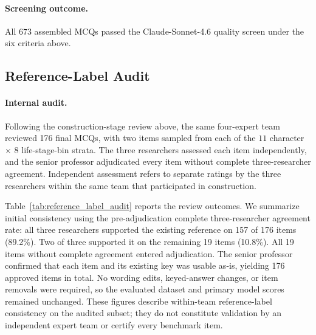 \documentclass[11pt]{article}
\begin{document}
\paragraph{Screening outcome.}
All $673$ assembled MCQs passed the Claude-Sonnet-4.6 quality screen under the six criteria above.

\subsection{Reference-Label Audit}
\label{app:reference_label_audit}

\paragraph{Internal audit.} Following the construction-stage review above, the same four-expert team reviewed 176 final MCQs, with two items sampled from each of the $11$ character $\times$ $8$ life-stage-bin strata. The three researchers assessed each item independently, and the senior professor adjudicated every item without complete three-researcher agreement. Independent assessment refers to separate ratings by the three researchers within the same team that participated in construction.

Table~\ref{tab:reference_label_audit} reports the review outcomes. We summarize initial consistency using the pre-adjudication complete three-researcher agreement rate: all three researchers supported the existing reference on 157 of 176 items (89.2\%). Two of three supported it on the remaining 19 items (10.8\%). All 19 items without complete agreement entered adjudication. The senior professor confirmed that each item and its existing key was usable as-is, yielding 176 approved items in total. No wording edits, keyed-answer changes, or item removals were required, so the evaluated dataset and primary model scores remained unchanged. These figures describe within-team reference-label consistency on the audited subset; they do not constitute validation by an independent expert team or certify every benchmark item.
\end{document}
